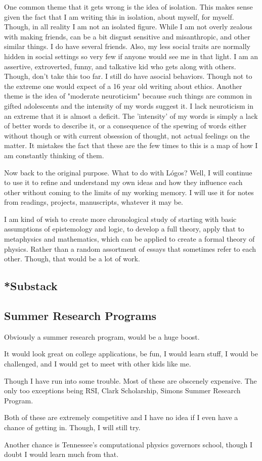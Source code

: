 \par One common theme that it gets wrong is the idea of isolation. This makes sense given the fact that I am writing this in isolation, about myself, for myself. Though, in all reality I am not an isolated figure. While I am not overly zealous with making friends, can be a bit disgust sensitive and misanthropic, and other similar things. I do have several friends. Also, my less social traits are normally hidden in social settings so very few if anyone would see me in that light. I am an assertive, extroverted, funny, and talkative kid who gets along with others. Though, don't take this too far. I still do have asocial behaviors. Though not to the extreme one would expect of a 16 year old writing about ethics. Another theme is the idea of "moderate neuroticism" because such things are common in gifted adolescents and the intensity of my words suggest it. I lack neuroticism in an extreme that it is almost a deficit. The 'intensity' of my words is simply a lack of better words to describe it, or a consequence of the spewing of words either without though or with current obsession of thought, not actual feelings on the matter. It mistakes the fact that these are the few times to this is a map of how I am constantly thinking of them.
\par Now back to the original purpose. What to do with Lógos? Well, I will continue to use it to refine and understand my own ideas and how they influence each other without coming to the limits of my working memory. I will use it for notes from readings, projects, manuscripts, whatever it may be. 
\par I am kind of wish to create more chronological study of starting with basic assumptions of epistemology and logic, to develop a full theory, apply that to metaphysics and mathematics, which can be applied to create a formal theory of physics. Rather than a random assortment of essays that sometimes refer to each other. Though, that would be a lot of work.
\subsection{*Substack}

\subsection{Summer Research Programs}
\par Obviously a summer research program, would be a huge boost.
\par It would look great on college applications, be fun, I would learn stuff, I would be challenged, and I would get to meet with other kids like me.
\par Though I have run into some trouble. Most of these are obscenely expensive. The only too exceptions being RSI, Clark Scholarship, Simons Summer Research Program. 
\par Both of these are extremely competitive and I have no idea if I even have a chance of getting in. Though, I will still try.
\\
\par Another chance is Tennessee's computational physics governors school, though I doubt I would learn much from that.
